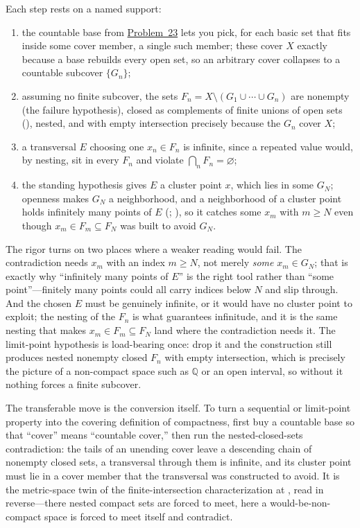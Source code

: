 \documentclass[main.tex]{subfiles}
\begin{document}
\begin{Reflection}
Each step rests on a named support:
\begin{enumerate}[leftmargin=1.7em,itemsep=3pt,topsep=2pt,label=\textnormal{(\arabic*)}]
  \item the countable base from \hyperlink{prob:23}{Problem~23} lets you pick, for each basic set that
        fits inside some cover member, a single such member; these cover $X$ exactly because a base
        rebuilds every open set, so an arbitrary cover collapses to a countable subcover $\{G_n\}$;
  \item assuming no finite subcover, the sets $F_n=X\setminus(G_1\cup\cdots\cup G_n)$ are nonempty (the
        failure hypothesis), closed as complements of finite unions of open sets (), nested,
        and with empty intersection precisely because the $G_n$ cover $X$;
  \item a transversal $E$ choosing one $x_n\in F_n$ is infinite, since a repeated value would, by
        nesting, sit in every $F_n$ and violate $\bigcap_n F_n=\varnothing$;
  \item the standing hypothesis gives $E$ a cluster point $x$, which lies in some $G_N$; openness makes
        $G_N$ a neighborhood, and a neighborhood of a cluster point holds infinitely many points of $E$
        (; ), so it catches some $x_m$ with
        $m\ge N$ even though $x_m\in F_m\subseteq F_N$ was built to avoid $G_N$.
\end{enumerate}

The rigor turns on two places where a weaker reading would fail. The contradiction needs $x_m$ with an
index $m\ge N$, not merely \emph{some} $x_m\in G_N$; that is exactly why ``infinitely many points of
$E$'' is the right tool rather than ``some point''---finitely many points could all carry indices below
$N$ and slip through. And the chosen $E$ must be genuinely infinite, or it would have no cluster point to
exploit; the nesting of the $F_n$ is what guarantees infinitude, and it is the same nesting that makes
$x_m\in F_m\subseteq F_N$ land where the contradiction needs it. The limit-point hypothesis is load-bearing
once: drop it and the construction still produces nested nonempty closed $F_n$ with empty intersection,
which is precisely the picture of a non-compact space such as $\mathbb Q$ or an open interval, so without
it nothing forces a finite subcover.

The transferable move is the conversion itself. To turn a sequential or limit-point property into the
covering definition of compactness, first buy a countable base so that ``cover'' means ``countable
cover,'' then run the nested-closed-sets contradiction: the tails of an unending cover leave a descending
chain of nonempty closed sets, a transversal through them is infinite, and its cluster point must lie in a
cover member that the transversal was constructed to avoid. It is the metric-space twin of the
finite-intersection characterization at , read in reverse---there nested compact sets are
forced to meet, here a would-be-non-compact space is forced to meet itself and contradict.
\end{Reflection}
\end{document}
